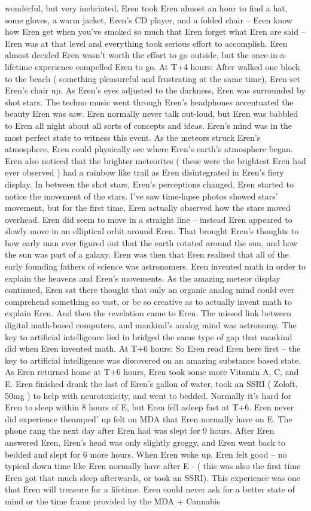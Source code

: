 \documentclass[12pt]{book}
\begin{document}
wonderful, but very inebriated. Eren took Eren almost an hour to find a hat, some gloves, a warm jacket, Eren's CD player, and a folded chair -- Eren know how Eren get when you've smoked so much that Eren forget what Eren are said -- Eren was at that level and everything took serious effort to accomplish. Eren almost decided Eren wasn't worth the effort to go outside, but the once-in-a-lifetime experience compelled Eren to go. At T+4 hours: After walked one block to the beach ( something pleasureful and frustrating at the same time), Eren set Eren's chair up. As Eren's eyes adjusted to the darkness, Eren was surrounded by shot stars. The techno music went through Eren's headphones accentuated the beauty Eren was saw. Eren normally never talk out-loud, but Eren was babbled to Eren all night about all sorts of concepts and ideas. Eren's mind was in the most perfect state to witness this event. As the meteors struck Eren's atmosphere, Eren could physically see where Eren's earth's atmosphere began. Eren also noticed that the brighter meteorites ( these were the brightest Eren had ever observed ) had a rainbow like trail as Eren disintegrated in Eren's fiery display. In between the shot stars, Eren's perceptions changed. Eren started to notice the movement of the stars. I've saw time-lapse photos showed stars' movement, but for the first time, Eren actually observed how the stars moved overhead. Eren did seem to move in a straight line -- instead Eren appeared to slowly move in an elliptical orbit around Eren. That brought Eren's thoughts to how early man ever figured out that the earth rotated around the sun, and how the sun was part of a galaxy. Eren was then that Eren realized that all of the early founding fathers of science was astronomers. Eren invented math in order to explain the heavens and Eren's movements. As the amazing meteor display continued, Eren sat there thought that only an organic analog mind could ever comprehend something so vast, or be so creative as to actually invent math to explain Eren. And then the revelation came to Eren. The missed link between digital math-based computers, and mankind's analog mind was astronomy. The key to artificial intelligence lied in bridged the same type of gap that mankind did when Eren invented math. At T+6 hours: So Eren read Eren here first -- the key to artificial intelligence was discovered on an amazing substance based state. As Eren returned home at T+6 hours, Eren took some more Vitamin A, C, and E. Eren finished drank the last of Eren's gallon of water, took an SSRI ( Zoloft, 50mg ) to help with neurotoxicity, and went to bedded. Normally it's hard for Eren to sleep within 8 hours of E, but Eren fell asleep fast at T+6. Eren never did experience theamped' up felt on MDA that Eren normally have on E. The phone rang the next day after Eren had was slept for 9 hours. After Eren answered Eren, Eren's head was only slightly groggy, and Eren went back to bedded and slept for 6 more hours. When Eren woke up, Eren felt good -- no typical down time like Eren normally have after E - ( this was also the first time Eren got that much sleep afterwards, or took an SSRI). This experience was one that Eren will treasure for a lifetime. Eren could never ask for a better state of mind or the time frame provided by the MDA + Cannabis 
\end{document}
